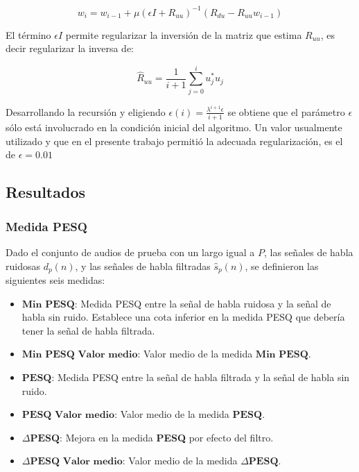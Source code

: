 \begin{equation}
	w_i = w_{i-1} + \mu (\epsilon I + R_{uu} )^{-1} \left( R_{du} - R_{uu} w_{i-1} \right)
\end{equation}

El término $\epsilon I$ permite regularizar la inversión de la matriz que estima $R_{uu}$, es decir regularizar la inversa de:

\begin{equation*}
	\hat{R}_{uu} = \frac{1}{i+1} \sum_{j=0}^{i} u_j^* u_j
\end{equation*}

Desarrollando la recursión y eligiendo $\epsilon(i) = \frac{\lambda^{i+1} \epsilon }{i+1}$ se obtiene que el parámetro $\epsilon$ sólo está involucrado en la condición inicial del algoritmo. Un valor usualmente utilizado y que en el presente trabajo permitió la adecuada regularización, es el de $\epsilon=0.01$


\subsection{Resultados}

\subsubsection{Medida PESQ}

Dado el conjunto de audios de prueba con un largo igual a $P$, las señales de habla ruidosas $d_p(n)$, y las señales de habla filtradas $\hat{s}_p(n)$, se definieron las siguientes seis medidas:

\begin{itemize}
	\item $\textbf{Min PESQ}$: Medida PESQ entre la señal de habla ruidosa y la señal de habla sin ruido. Establece una cota inferior en la medida PESQ que debería tener la señal de habla filtrada.
	\item $\textbf{Min PESQ Valor medio}$: Valor medio de la medida $\textbf{Min PESQ}$.
	\item $\textbf{PESQ}$: Medida PESQ entre la señal de habla filtrada y la señal de habla sin ruido.
	\item $\textbf{PESQ Valor medio}$: Valor medio de la medida $\textbf{PESQ}$.
	\item $\Delta \textbf{PESQ}$: Mejora en la medida \textbf{PESQ} por efecto del filtro.
	\item $\Delta \textbf{PESQ Valor medio}$: Valor medio de la medida $\Delta \textbf{PESQ}$.
\end{itemize}

